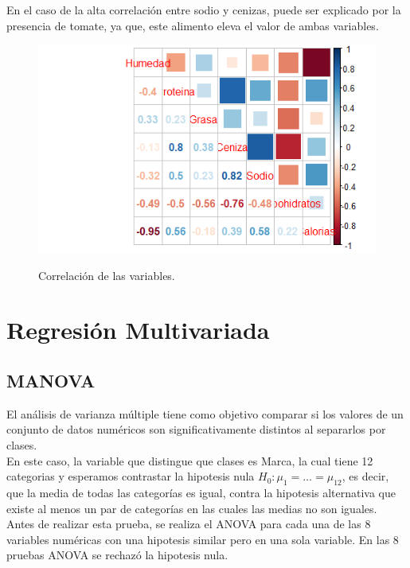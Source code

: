 \documentclass[12pt, letterpaper]{article}
\begin{document}
En el caso de la alta correlación entre sodio y cenizas, puede ser explicado por la presencia de tomate, ya que, este alimento eleva el valor de ambas variables.\\

\begin{figure}[h]
\centering
\includegraphics[scale=1]{images/corr.png} 
\label{i11}
\caption{Correlación de las variables.}
\end{figure}


 
 
 

\pagebreak
\section{Regresión Multivariada}
\subsection{MANOVA}
El análisis de varianza múltiple tiene como objetivo comparar si los valores de un conjunto de datos numéricos son significativamente distintos al separarlos por clases.\\

En este caso, la variable que distingue que clases es Marca, la cual tiene 12 categorias y esperamos contrastar la hipotesis nula $H_0:\mu_1=\hdots=\mu_12$, es decir, que la media de todas las categorías es igual, contra la hipotesis alternativa que existe al menos un par de categorías en las cuales las medias no son iguales.\\

Antes de realizar esta prueba, se realiza el ANOVA para cada una de las 8 variables numéricas con una hipotesis similar pero en una sola variable. En las 8 pruebas ANOVA se rechazó la hipotesis nula.\\
\end{document}
